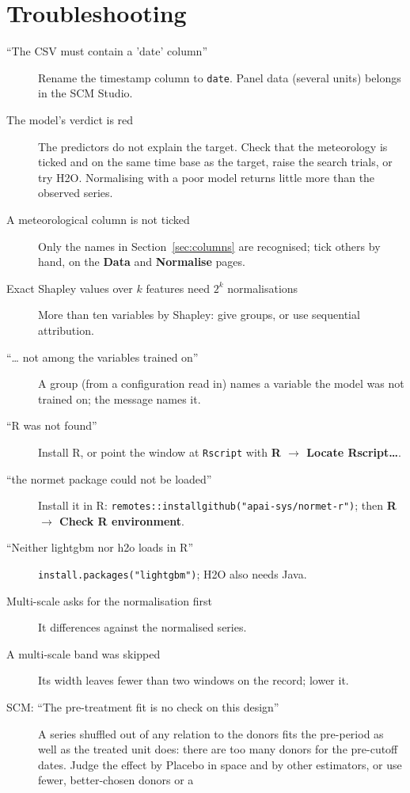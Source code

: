 \documentclass[11pt]{report}
\newcommand{\codeunderscore}{\textunderscore\allowbreak}
\newcommand{\code}[1]{\texttt{\let\_\codeunderscore #1}}
\newcommand{\tab}[1]{\textbf{#1}}
\begin{document}
\chapter{Troubleshooting}\label{app:trouble}
\begin{description}
  \item[``The CSV must contain a 'date' column''] Rename the timestamp column to
        \code{date}. Panel data (several units) belongs in the SCM Studio.
  \item[The model's verdict is red] The predictors do not explain the target. Check that
        the meteorology is ticked and on the same time base as the target, raise the
        search trials, or try H2O. Normalising with a poor model returns little more than
        the observed series.
  \item[A meteorological column is not ticked] Only the names in
        Section~\ref{sec:columns} are recognised; tick others by hand, on the \tab{Data}
        and \tab{Normalise} pages.
  \item[Exact Shapley values over $k$ features need $2^k$ normalisations] More than ten
        variables by Shapley: give groups, or use sequential attribution.
  \item[``\ldots{} not among the variables trained on''] A group (from a configuration
        read in) names a variable the model was not trained on; the message names it.
  \item[``R was not found''] Install R, or point the window at \code{Rscript} with
        \tab{R $\rightarrow$ Locate Rscript\ldots}.
  \item[``the normet package could not be loaded''] Install it in R:
        \code{remotes::install\_github("apai-sys/normet-r")}; then
        \tab{R $\rightarrow$ Check R environment}.
  \item[``Neither lightgbm nor h2o loads in R''] \code{install.packages("lightgbm")}; H2O
        also needs Java.
  \item[Multi-scale asks for the normalisation first] It differences against the
        normalised series.
  \item[A multi-scale band was skipped] Its width leaves fewer than two windows on the
        record; lower it.
  \item[SCM: ``The pre-treatment fit is no check on this design''] A series shuffled out
        of any relation to the donors fits the pre-period as well as the treated unit
        does: there are too many donors for the pre-cutoff dates. Judge the effect by
        Placebo in space and by other estimators, or use fewer, better-chosen donors or a

\end{description}
\end{document}
